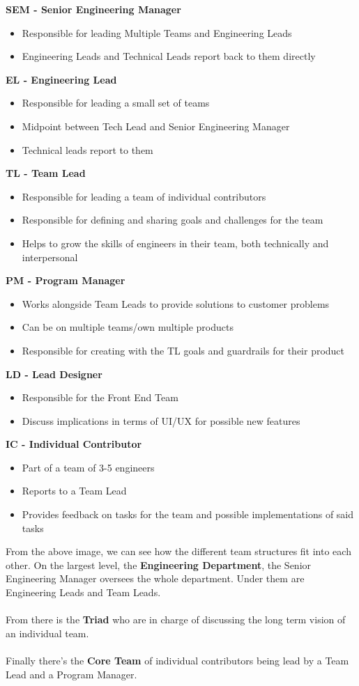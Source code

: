 \documentclass[12pt]{article} %
\begin{document}
\textbf{SEM -  Senior Engineering Manager}
\begin{itemize}
	\item Responsible for leading Multiple Teams and Engineering Leads
	\item Engineering Leads and Technical Leads report back to them directly
\end{itemize}
\textbf{EL -  Engineering Lead}
\begin{itemize}
\item Responsible for leading a small set of teams
\item Midpoint between Tech Lead and Senior Engineering Manager
\item Technical leads report to them
\end{itemize}
\textbf{TL -  Team Lead}
\begin{itemize}
\item Responsible for leading a team of individual contributors
\item Responsible for defining and sharing goals and challenges for the team
\item Helps to grow the skills of engineers in their team, both technically and interpersonal
\end{itemize}
\textbf{PM -  Program Manager}
\begin{itemize}
\item Works alongside Team Leads to provide solutions to customer problems
\item Can be on multiple teams/own multiple products
\item Responsible for creating with the TL goals and guardrails for their product
\end{itemize}
\textbf{LD -  Lead Designer}
\begin{itemize}
\item Responsible for the Front End Team
\item Discuss implications in terms of UI/UX for possible new features
\end{itemize}
\textbf{IC -  Individual Contributor}
\begin{itemize}
\item Part of a team of 3-5 engineers
\item Reports to a Team Lead
\item Provides feedback on tasks for the team and possible implementations of said tasks
\end{itemize}
From the above image, we can see how the different team structures fit into each other. On the largest level, the \textbf{Engineering Department}, the Senior Engineering Manager oversees the whole department. Under them are Engineering Leads and Team Leads. 
\\\\
From there is the \textbf{Triad} who are in charge of discussing the long term vision of an individual team. 
\\\\
Finally there's the \textbf{Core Team} of individual contributors being lead by a Team Lead and a Program Manager.
\newpage
\end{document}
